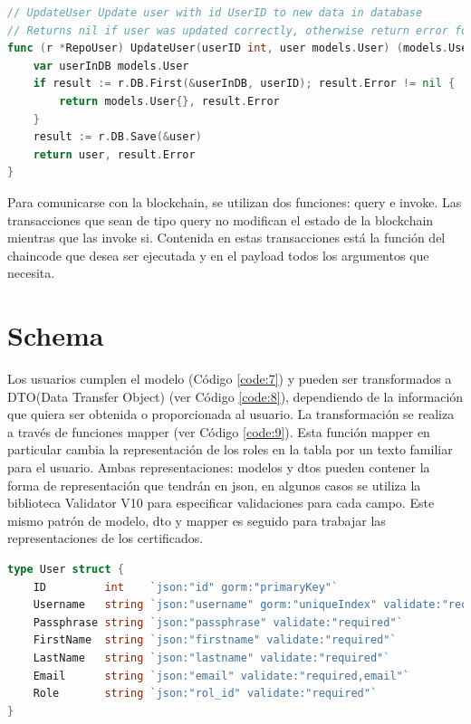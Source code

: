 \begin{lstlisting}[language=Go,caption={Función para modificar un usuario}, label={code:6}]
// UpdateUser Update user with id UserID to new data in database
// Returns nil if user was updated correctly, otherwise return error found
func (r *RepoUser) UpdateUser(userID int, user models.User) (models.User, error) {
	var userInDB models.User
	if result := r.DB.First(&userInDB, userID); result.Error != nil {
		return models.User{}, result.Error
	}
	result := r.DB.Save(&user)
	return user, result.Error
}
\end{lstlisting}

Para comunicarse con la blockchain, se utilizan dos funciones: query e invoke. Las transacciones que sean de tipo query no modifican el estado de la blockchain mientras que las invoke si. Contenida en estas transacciones está la función del chaincode que desea ser ejecutada y en el payload todos los argumentos que necesita.

\section{Schema}
Los usuarios cumplen el modelo (Código \ref{code:7}) y pueden ser transformados a DTO(Data Transfer Object) (ver Código \ref{code:8}), dependiendo de la información que quiera ser obtenida o proporcionada al usuario. La transformación se realiza a través de funciones mapper (ver Código \ref{code:9}). Esta función mapper en particular cambia la representación de los roles en la tabla por un texto familiar para el usuario. Ambas representaciones: modelos y dtos pueden contener la forma de representación que tendrán en json, en algunos casos se utiliza la biblioteca Validator V10 para especificar validaciones para cada campo. Este mismo patrón de modelo, dto y mapper es seguido para trabajar las representaciones de los certificados.

\begin{lstlisting}[language=Go,caption={Modelo de usuarios}, label={code:7}]
type User struct {
	ID         int    `json:"id" gorm:"primaryKey"`
	Username   string `json:"username" gorm:"uniqueIndex" validate:"required"`
	Passphrase string `json:"passphrase" validate:"required"`
	FirstName  string `json:"firstname" validate:"required"`
	LastName   string `json:"lastname" validate:"required"`
	Email      string `json:"email" validate:"required,email"`
	Role       string `json:"rol_id" validate:"required"`
}
\end{lstlisting}

